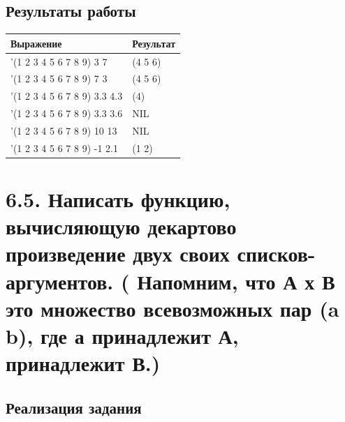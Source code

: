 \documentclass[a4paper,12pt]{article}
\begin{document}
 	\subsection*{Результаты работы}
 	
 	\begin{table} [h!]
 		\begin{center}
 			\begin{tabular}{|l|l|}
 				\hline
 				{\bf  Выражение} &    {\bf Результат} \\
 				\hline
 				{'(1 2 3 4 5 6 7 8 9) 3 7} & (4 5 6)\\
 				\hline
 				{'(1 2 3 4 5 6 7 8 9) 7 3} & (4 5 6)\\
 				\hline
 				{'(1 2 3 4 5 6 7 8 9) 3.3 4.3} & (4)\\
 				\hline
 				{'(1 2 3 4 5 6 7 8 9) 3.3 3.6} & NIL\\
 				\hline
 				{'(1 2 3 4 5 6 7 8 9) 10 13} & NIL\\
 				\hline
 				{'(1 2 3 4 5 6 7 8 9) -1 2.1} & (1 2)\\
 				\hline
 			\end{tabular}  
 			\label{m2}
 		\end{center}
 	\end{table}
 	
 	
 	\newpage
 	
 	\section*{6.5. Написать функцию, вычисляющую декартово произведение двух своих списков-аргументов. ( Напомним, что А х В это множество всевозможных пар (a b), где а принадлежит А, принадлежит В.)
 	}
 	
 	\subsection*{Реализация задания}
 	
\end{document}
